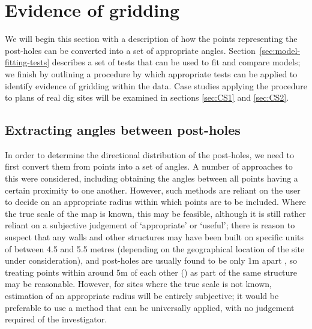 \documentclass[../../ArchStats.tex]{subfiles}
\begin{document}


\section{Evidence of gridding}

We will begin this section with a description of how the points representing the post-holes can be converted into a set of appropriate angles. Section~\ref{sec:model-fitting-tests} describes a set of tests that can be used to fit and compare models; we finish by outlining a procedure by which appropriate tests can be applied to identify evidence of gridding within the data. Case studies applying the procedure to plans of real dig sites will be examined in sections \ref{sec:CS1} and \ref{sec:CS2}.


\subsection{Extracting angles between post-holes}

In order to determine the directional distribution of the post-holes, we need to first convert them from points into a set of angles. A number of approaches to this were considered, including obtaining the angles between all points having a certain proximity to one another. However, such methods are reliant on the user to decide on an appropriate radius within which points are to be included. Where the true scale of the map is known, this may be feasible, although it is still rather reliant on a subjective judgement of `appropriate' or `useful'; there is reason to suspect that any walls and other structures may have been built on specific units of between 4.5 and 5.5 metres (depending on the geographical location of the site under consideration), and post-holes are usually found to be only 1m apart , so treating points within around 5m of each other () as part of the same structure may be reasonable. However, for sites where the true scale is not known, estimation of an appropriate radius will be entirely subjective; it would be preferable to use a method that can be universally applied, with no judgement required of the investigator.
\end{document}
